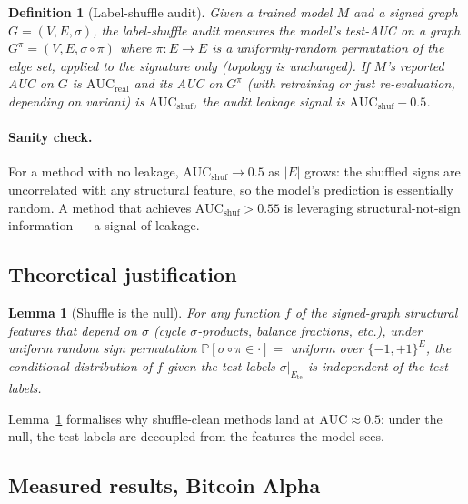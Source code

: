 \documentclass[11pt,a4paper]{article}
\newtheorem{lemma}[theorem]{Lemma}
\newtheorem{definition}[theorem]{Definition}
\theoremstyle{remark}
\newcommand{\Prob}{\mathbb{P}}
\begin{document}
\begin{definition}[Label-shuffle audit]
Given a trained model $M$ and a signed graph $G = (V, E, \sigma)$,
the \emph{label-shuffle audit} measures the model's test-AUC on a
graph $G^\pi = (V, E, \sigma \circ \pi)$ where $\pi : E \to E$
is a uniformly-random permutation of the edge set, applied to the
signature only (topology is unchanged). If $M$'s reported AUC on
$G$ is $\mathrm{AUC}_{\text{real}}$ and its AUC on $G^\pi$ (with
retraining or just re-evaluation, depending on variant) is
$\mathrm{AUC}_{\text{shuf}}$, the audit \emph{leakage signal} is
$\mathrm{AUC}_{\text{shuf}} - 0.5$.
\end{definition}

\paragraph{Sanity check.} For a method with no leakage,
$\mathrm{AUC}_{\text{shuf}} \to 0.5$ as $|E|$ grows: the shuffled
signs are uncorrelated with any structural feature, so the
model's prediction is essentially random. A method that achieves
$\mathrm{AUC}_{\text{shuf}} > 0.55$ is leveraging
structural-not-sign information --- a signal of leakage.

\subsection{Theoretical justification}

\begin{lemma}[Shuffle is the null]\label{lem:shuffle-null}
For any function $f$ of the signed-graph structural features
that depend on $\sigma$ (cycle $\sigma$-products, balance
fractions, etc.), under uniform random sign permutation
$\Prob[\sigma \circ \pi \in \cdot] = $ uniform over
$\{-1, +1\}^E$, the conditional distribution of $f$ given the
test labels $\sigma|_{E_{\text{te}}}$ is independent of the test
labels.
\end{lemma}

Lemma~\ref{lem:shuffle-null} formalises why shuffle-clean methods
land at $\mathrm{AUC} \approx 0.5$: under the null, the test
labels are decoupled from the features the model sees.

\subsection{Measured results, Bitcoin Alpha}
\end{document}

